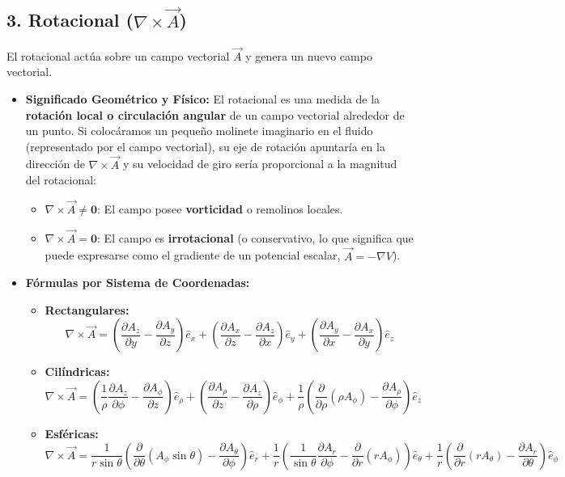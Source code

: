 \documentclass[11pt, a4paper]{article}
\begin{document}
\vspace{0.3cm}

\subsection{3. Rotacional ($\nabla \times \vec{A}$)}

El rotacional actúa sobre un campo vectorial $\vec{A}$ y genera un nuevo campo vectorial.

\begin{itemize}
    \item \textbf{Significado Geométrico y Físico:}
    El rotacional es una medida de la \textbf{rotación local o circulación angular} de un campo vectorial alrededor de un punto. Si colocáramos un pequeño molinete imaginario en el fluido (representado por el campo vectorial), su eje de rotación apuntaría en la dirección de $\nabla \times \vec{A}$ y su velocidad de giro sería proporcional a la magnitud del rotacional:
    \begin{itemize}
        \item $\nabla \times \vec{A} \neq \mathbf{0}$: El campo posee \textbf{vorticidad} o remolinos locales.
        \item $\nabla \times \vec{A} = \mathbf{0}$: El campo es \textbf{irrotacional} (o conservativo, lo que significa que puede expresarse como el gradiente de un potencial escalar, $ \vec{A} = -\nabla V $).
    \end{itemize}
    
    \item \textbf{Fórmulas por Sistema de Coordenadas:}
    \begin{itemize}
        \item \textbf{Rectangulares:}
        $$\nabla \times \vec{A} = \left(\frac{\partial A_z}{\partial y} - \frac{\partial A_y}{\partial z}\right)\hat{e}_x + \left(\frac{\partial A_x}{\partial z} - \frac{\partial A_z}{\partial x}\right)\hat{e}_y + \left(\frac{\partial A_y}{\partial x} - \frac{\partial A_x}{\partial y}\right)\hat{e}_z$$
        
        \item \textbf{Cilíndricas:}
        $$\nabla \times \vec{A} = \left(\frac{1}{\rho}\frac{\partial A_z}{\partial \phi} - \frac{\partial A_\phi}{\partial z}\right)\hat{e}_\rho + \left(\frac{\partial A_\rho}{\partial z} - \frac{\partial A_z}{\partial \rho}\right)\hat{e}_\phi + \frac{1}{\rho}\left(\frac{\partial}{\partial \rho}(\rho A_\phi) - \frac{\partial A_\rho}{\partial \phi}\right)\hat{e}_z$$
        
        \item \textbf{Esféricas:}
        $$\nabla \times \vec{A} = \frac{1}{r\sin\theta}\left(\frac{\partial}{\partial \theta}(A_\phi\sin\theta) - \frac{\partial A_\theta}{\partial \phi}\right)\hat{e}_r + \frac{1}{r}\left(\frac{1}{\sin\theta}\frac{\partial A_r}{\partial \phi} - \frac{\partial}{\partial r}(r A_\phi)\right)\hat{e}_\theta + \frac{1}{r}\left(\frac{\partial}{\partial r}(r A_\theta) - \frac{\partial A_r}{\partial \theta}\right)\hat{e}_\phi$$
    \end{itemize}
\end{itemize}
\end{document}
